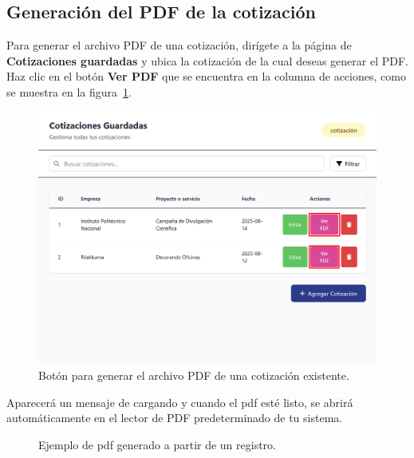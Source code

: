 \documentclass{Pretexto/bluereport}
\begin{document}
\begin{minipage}
\subsection{Generación del PDF de la cotización}
Para generar el archivo PDF de una cotización, dirígete a la página de \textbf{Cotizaciones guardadas} y ubica la cotización de la cual deseas generar el PDF.
Haz clic en el botón \textbf{Ver PDF} que se encuentra en la columna de acciones, como se muestra en la figura~\ref{fig:generar_pdf}.
\begin{figure}[H]
    \centering
        \includegraphics[width=0.8\linewidth]{img/generar_pdf.png}
    \caption{Botón para generar el archivo PDF de una cotización existente.}
    \label{fig:generar_pdf}
\end{figure}
Aparecerá un mensaje de cargando y cuando el pdf esté listo, se abrirá automáticamente en el lector de PDF predeterminado de tu sistema. 
\begin{figure}[H]
    \centering
    \caption{Ejemplo de pdf generado a partir de un registro.}
    \label{fig:resultado_pdf}
\end{figure}

\end{minipage}
\end{document}
